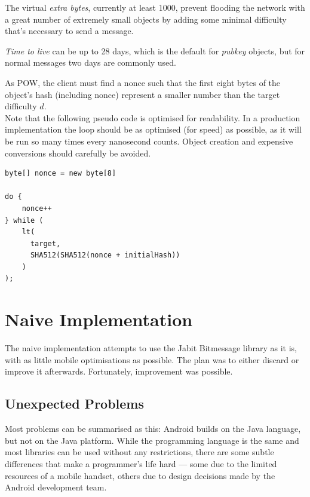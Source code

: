 \documentclass{bfh}
\begin{document}
  The virtual \textit{extra bytes}, currently at least 1000, prevent flooding the network with a great number of extremely small objects by adding some minimal difficulty that's necessary to send a message.

  \textit{Time to live} can be up to 28 days, which is the default for \textit{pubkey} objects, but for normal messages two days are commonly used.

  As \acl{POW}, the client must find a \acs{nonce} such that the first eight bytes of the object's hash (including \acs{nonce}) represent a smaller number than the target difficulty $d$.\\

  Note that the following pseudo code is optimised for readability. In a production implementation the loop should be as optimised (for speed) as possible, as it will be run so many times every nanosecond counts. Object creation and expensive conversions should carefully be avoided.

\begin{lstlisting}
byte[] nonce = new byte[8]

do {
    nonce++
} while (
    lt(
      target,
      SHA512(SHA512(nonce + initialHash))
    )
);
\end{lstlisting}



  \newpage
  \section{Naive Implementation}
  
  The naive implementation attempts to use the Jabit Bitmessage library as it is, with as little mobile optimisations as possible. The plan was to either discard or improve it afterwards. Fortunately, improvement was possible.

  \subsection{Unexpected Problems}
  Most problems can be summarised as this: Android builds on the Java language, but not on the Java platform. While the programming language is the same and most libraries can be used without any restrictions, there are some subtle differences that make a programmer's life hard --- some due to the limited resources of a mobile handset, others due to design decisions made by the Android development team.
  
\end{document}
